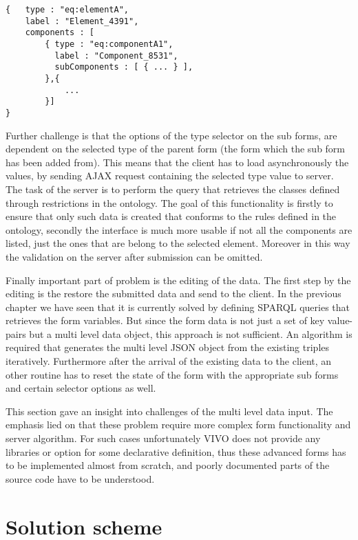 \begin{lstlisting}[basicstyle=\footnotesize, frame=single, caption={Multi level form data in JSON}, label=multiData, captionpos=b, belowskip=1em, aboveskip=2em]
{	type : "eq:elementA",
	label : "Element_4391",
	components : [
		{ type : "eq:componentA1",
		  label : "Component_8531",	
		  subComponents : [ { ... } ],
		},{ 
			... 
		}]
}
\end{lstlisting}


Further challenge is that the options of the type selector on the sub forms, are dependent on the selected type of the parent form (the form which the sub form has been added from). This means that the client has to load asynchronously the values, by sending AJAX request containing the selected type value to server. The task of the server is to perform the query that retrieves the classes defined through restrictions in the ontology. The goal of this functionality is firstly to ensure that only such data is created that conforms to the rules defined in the ontology, secondly the interface is much more usable if not all the components are listed, just the ones that are belong to the selected element. Moreover in this way the validation on the server after submission can be omitted.

Finally important part of problem is the editing of the data. The first step by the editing is the restore the submitted data and send to the client. In the previous chapter we have seen that it is currently solved by defining  SPARQL queries that retrieves the form variables. But since the form data is not just a set of key value-pairs but a multi level data object, this approach is not sufficient. An algorithm is required that generates the multi level JSON object from the existing triples iteratively. Furthermore after the arrival of the existing data to the client, an other routine has to reset the state of the form with the appropriate sub forms and certain selector options as well.


This section gave an insight into challenges of the multi level data input. The emphasis lied on that these problem require more complex form functionality and server algorithm. For such cases unfortunately VIVO does not provide any libraries or option for some declarative definition, thus these advanced forms has to be implemented almost from scratch, and poorly documented parts of the source code have to be understood.


\section{Solution scheme}

